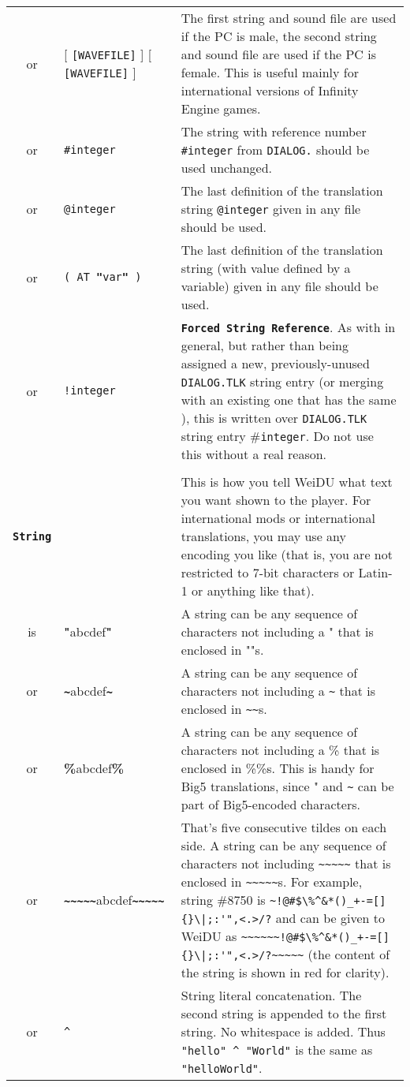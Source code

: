 \documentclass{article}
\def\ttref#1{\ahrefloc{#1}{\tt #1}}
\def\DEFINE#1{{\tt \bf #1}\label{#1}\index{#1}}
\def\t#1{{\tt #1}}
\def\Ob{{\color{red} [ }}
\def\Oe{{\color{red} ] }}
\begin{document}
\begin{tabular}{cp{10in}|p{10in}}
or & \ttref{String} \Ob \t{[WAVEFILE]} \Oe \ttref{String} \Ob \t{[WAVEFILE]} \Oe &
The first string and sound file are used if the PC is male, the second
string and sound file are used if the PC is female. This is useful mainly
for international versions of Infinity Engine games. \\

or & \t{\#integer} & The string with reference number \t{\#integer} from
\t{DIALOG.}\ttref{TLK} should be used unchanged. \\

or & \t{@integer} & The last definition of the translation string
\t{@integer} given in any \ttref{TRA} file should be used.\\

or & \t{( AT {\bf{"}}var{\bf{"}} )} & The last definition of the translation string
(with value defined by a variable) given in any \ttref{TRA} file should be used.\\

or & \t{!integer} \ttref{text} & \DEFINE{Forced String Reference}. As with
\ttref{text} in general, but rather than being assigned a new,
previously-unused \t{DIALOG.TLK} string entry (or merging with an existing
one that has the same \ttref{text}), this \ttref{text} is written over
\t{DIALOG.TLK} string entry \#\t{integer}. Do not use this without a real reason.
\\

\\

\DEFINE{String} & & This is how you tell WeiDU what text you want shown
to the player. For international mods or international translations, you 
may use any encoding you like (that is, you are not restricted to 7-bit
characters or Latin-1 or anything like that). \\
is & {\bf{"}}abcdef{\bf{"}} & A string can be any sequence of characters not
including a " that is enclosed in ""s. \\
or & {\bf{\verb+~+}}abcdef{\bf\verb+~+} & A string can be any sequence of
characters not including a \verb+~+ that is enclosed in
{\verb+~+\verb+~+}s. \\
or & {\bf{\%}}abcdef{\bf{\%}} & A string can be any sequence of characters not
including a \% that is enclosed in \%\%s. This is handy for Big5
translations, since " and \verb+~+ can be part of Big5-encoded characters.
\\
or & {\bf{\verb+~~~~~+}}abcdef{\bf\verb+~~~~~+} & That's five consecutive
tildes on each side. A string can be any
sequence of characters not including \verb+~~~~~+ that is enclosed in 
{\verb+~~~~~+}s. For example, 
string \#8750 is
{\color{red}\verb`~!@#$\%^&*()_+-=[]{}\|;:'",<.>/?`}
and can be given to WeiDU as
{\verb+~~~~~+}{\color{red}\verb`~!@#$\%^&*()_+-=[]{}\|;:'",<.>/?`}{\verb+~~~~~+}
 (the content of the string is shown in red for clarity). 
\\
or & \ttref{String} \t{\^{ }} \ttref{String} & String literal concatenation.
The second string is appended to the first string. No whitespace is added.
Thus \t{"hello" \^{ } "World"} is the same as \t{"helloWorld"}.


\end{tabular}
\end{document}
